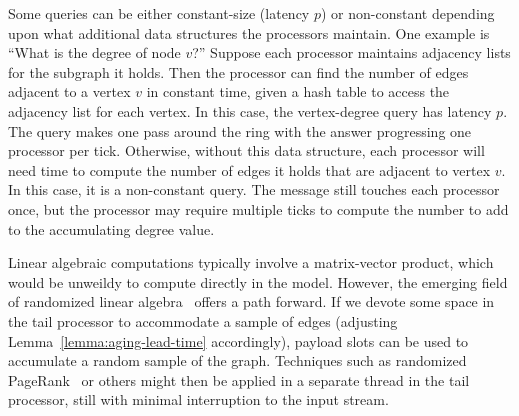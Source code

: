 Some queries can be either constant-size (latency $p$) or non-constant
depending upon what additional data structures the processors
maintain.  One example is ``What is the degree of node $v$?'' Suppose
each processor maintains adjacency lists for the subgraph it
holds. Then the processor can find the number of edges adjacent to a
vertex $v$ in constant time, given a hash table to access the
adjacency list for each vertex.  In this case, the vertex-degree query
has latency $p$.  The query makes one pass around the ring with the answer progressing
one processor per tick.  Otherwise, without this data structure, each processor will need time to
compute the number of edges it holds that are adjacent to vertex $v$.
In this case, it is a non-constant query.  The message still touches
each processor once, but the processor may require multiple ticks to
compute the number to add to the accumulating degree value.

Linear algebraic computations typically involve a matrix-vector product,
which would be unweildy to compute directly in the \XStream model.
However, the emerging field of randomized linear
algebra~\cite{drineas2018lectures}
offers a path forward. If we devote some space in the tail processor to
accommodate a sample of edges (adjusting Lemma~\ref{lemma:aging-lead-time}
accordingly), payload slots can be used to accumulate a random sample
of the graph.  Techniques such as randomized 
PageRank~\cite{gasnikov2015efficient} or others might then be applied in a 
separate
thread in the tail processor, still with minimal interruption to the input 
stream.
